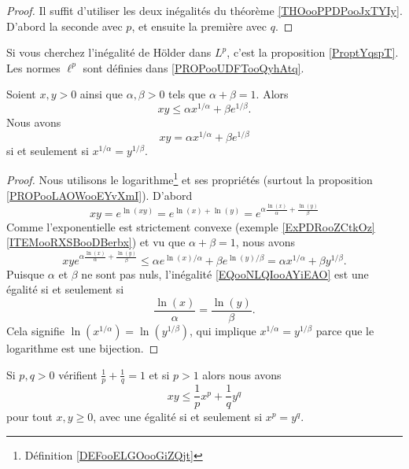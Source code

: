 \begin{proof}
	Il suffit d'utiliser les deux inégalités du théorème \ref{THOooPPDPooJxTYIy}. D'abord la seconde avec \( p\), et ensuite la première avec \( q\).
\end{proof}


Si vous cherchez l'inégalité de Hölder dans \( L^p\), c'est la proposition \ref{ProptYqspT}. Les normes \(  \ell^p\) sont définies dans \ref{PROPooUDFTooQyhAtq}.

\begin{lemma}     \label{LEMooLGGDooGLGFHj}
	Soient \( x,y>0\) ainsi que \( \alpha,\beta>0\) tels que \( \alpha+\beta=1\). Alors
	\begin{equation}
		xy\leq \alpha x^{1/\alpha}+\beta e^{1/\beta}.
	\end{equation}
	Nous avons
	\begin{equation}
		xy= \alpha x^{1/\alpha}+\beta e^{1/\beta}
	\end{equation}
	si et seulement si \( x^{1/\alpha}=y^{1/\beta}\).
\end{lemma}

\begin{proof}
	Nous utilisons le logarithme\footnote{Définition \ref{DEFooELGOooGiZQjt}} et ses propriétés (surtout la proposition \ref{PROPooLAOWooEYvXmI}). D'abord
	\begin{equation}
		xy= e^{\ln(xy)}= e^{\ln(x)+\ln(y)}= e^{\alpha\frac{ \ln(x) }{ \alpha }+\frac{ \ln(y) }{ \beta }}
	\end{equation}
	Comme l'exponentielle est strictement convexe (exemple \ref{ExPDRooZCtkOz}\ref{ITEMooRXSBooDBerbx}) et vu que \( \alpha+\beta=1\), nous avons
	\begin{equation}        \label{EQooNLQIooAYiEAO}
		xy e^{\alpha\frac{ \ln(x) }{ \alpha }+\frac{ \ln(y) }{ \beta }}\leq \alpha e^{\ln(x)/\alpha}+\beta e^{\ln(y)/\beta}=\alpha x^{1/\alpha}+\beta y^{1/\beta}.
	\end{equation}
	Puisque \( \alpha\) et \( \beta\) ne sont pas nuls, l'inégalité \eqref{EQooNLQIooAYiEAO} est une égalité si et seulement si
	\begin{equation}
		\frac{ \ln(x) }{ \alpha }=\frac{ \ln(y) }{ \beta }.
	\end{equation}
	Cela signifie \( \ln(x^{1/\alpha})=\ln(y^{1/\beta})\), qui implique \( x^{1/\alpha}=y^{1/\beta}\) parce que le logarithme est une bijection.
\end{proof}

\begin{corollary}       \label{CORooTCBZooAcZxaC}
	Si \( p,q>0\) vérifient \( \frac{1}{ p }+\frac{1}{ q }=1\) et si \( p>1\) alors nous avons
	\begin{equation}        \label{EQooWKTSooQwRsLz}
		xy\leq \frac{1}{ p }x^{p}+\frac{1}{ q }y^q
	\end{equation}
	pour tout \( x,y\geq 0\), avec une égalité si et seulement si \( x^p=y^q\).
\end{corollary}

